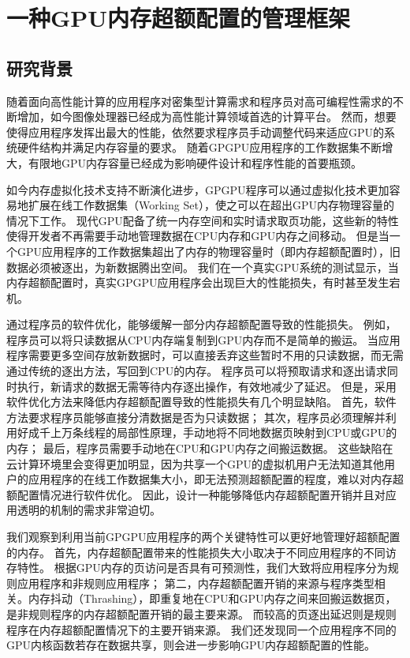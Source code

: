 \chapter{一种GPU内存超额配置的管理框架}
\label{chap:ETC}

\section{研究背景}

随着面向高性能计算的应用程序对密集型计算需求和程序员对高可编程性需求的不断增加，如今图像处理器已经成为高性能计算领域首选的计算平台。
然而，想要使得应用程序发挥出最大的性能，依然要求程序员手动调整代码来适应GPU的系统硬件结构并满足内存容量的要求。
随着GPGPU应用程序的工作数据集不断增大，有限地GPU内存容量已经成为影响硬件设计和程序性能的首要瓶颈。

如今内存虚拟化技术支持不断演化进步，GPGPU程序可以通过虚拟化技术更加容易地扩展在线工作数据集（Working Set），使之可以在超出GPU内存物理容量的情况下工作。
现代GPU配备了统一内存空间和实时请求取页功能，这些新的特性使得开发者不再需要手动地管理数据在CPU内存和GPU内存之间移动。
但是当一个GPU应用程序的工作数据集超出了内存的物理容量时（即内存超额配置时），旧数据必须被逐出，为新数据腾出空间。
我们在一个真实GPU系统的测试显示，当内存超额配置时，真实GPGPU应用程序会出现巨大的性能损失，有时甚至发生宕机。

通过程序员的软件优化，能够缓解一部分内存超额配置导致的性能损失。
例如，程序员可以将只读数据从CPU内存端复制到GPU内存而不是简单的搬运。
当应用程序需要更多空间存放新数据时，可以直接丢弃这些暂时不用的只读数据，而无需通过传统的逐出方法，写回到CPU的内存。
程序员可以将预取请求和逐出请求同时执行，新请求的数据无需等待内存逐出操作，有效地减少了延迟。
但是，采用软件优化方法来降低内存超额配置导致的性能损失有几个明显缺陷。
首先，软件方法要求程序员能够直接分清数据是否为只读数据；
其次，程序员必须理解并利用好成千上万条线程的局部性原理，手动地将不同地数据页映射到CPU或GPU的内存；
最后，程序员需要手动地在CPU和GPU内存之间搬运数据。
这些缺陷在云计算环境里会变得更加明显，因为共享一个GPU的虚拟机用户无法知道其他用户的应用程序的在线工作数据集大小，即无法预测超额配置的程度，难以对内存超额配置情况进行软件优化。
因此，设计一种能够降低内存超额配置开销并且对应用透明的机制的需求非常迫切。

我们观察到利用当前GPGPU应用程序的两个关键特性可以更好地管理好超额配置的内存。
首先，内存超额配置带来的性能损失大小取决于不同应用程序的不同访存特性。
根据GPU内存的页访问是否具有可预测性，我们大致将应用程序分为规则应用程序和非规则应用程序；
第二，内存超额配置开销的来源与程序类型相关。内存抖动（Thrashing），即重复地在CPU和GPU内存之间来回搬运数据页，是非规则程序的内存超额配置开销的最主要来源。
而较高的页逐出延迟则是规则程序在内存超额配置情况下的主要开销来源。
我们还发现同一个应用程序不同的GPU内核函数若存在数据共享，则会进一步影响GPU内存超额配置的性能。

